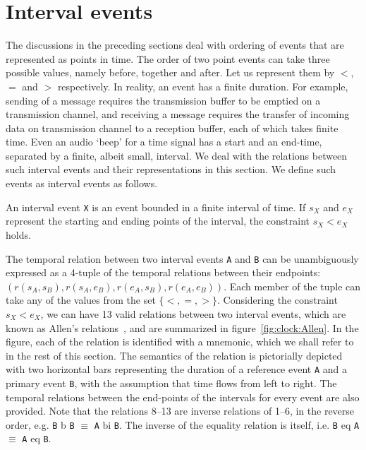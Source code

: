 \section{Interval events}

The discussions in the preceding sections deal with ordering of events that are represented as points in time. 
The order of two point events can take three possible values, namely before, together and after. Let us represent them by 
$<$, $=$ and $>$ respectively.
%
In reality, an event has a finite duration. For example, sending of a message requires the transmission buffer to be emptied 
on a transmission channel, and receiving a message requires the transfer of incoming data on transmission channel to a 
reception buffer, each of which takes finite time. Even an audio `beep' for a time signal has a start and an end-time, 
separated by a finite, albeit small, interval. We deal with the relations between such interval events and their representations 
in this section.  We define such events as interval events as follows.

\begin{definition}
	An interval event \texttt{X} is an event bounded in a finite interval of time. If $s_X$ and $e_X$ represent
	the starting and ending points of the interval, the constraint $s_X < e_X$ holds.
\end{definition}

The temporal relation between two interval events \texttt{A} and \texttt{B} can be unambiguously expressed as a 4-tuple of  
the temporal relations between their endpoints: $( r(s_A, s_B), r(s_A, e_B), r(e_A, s_B), r(e_A, e_B) )$. Each member of the 
tuple can take any of the values from the set $\{<,=,>\}$. Considering the constraint $s_X < e_X$, we can have 13 valid relations
between two interval events, which are known as Allen's relations~\cite{Allen:1983}, and are summarized in 
figure~\ref{fig:clock:Allen}. 
%
In the figure, each of the relation is identified with a mnemonic, which we shall refer to in the rest of this section. The semantics 
of the relation is pictorially depicted with two horizontal bars representing the duration of a reference event \texttt{A} and 
a primary event \texttt{B}, with the assumption that time flows from left to right. The temporal relations between the end-points 
of the intervals for every event are also provided. 
Note that the relations 8--13 are inverse relations of 1--6, in the reverse order, e.g. 
\texttt{B} b \texttt{B} $\equiv$ \texttt{A} bi \texttt{B}. The inverse of the equality relation is itself, i.e. 
\texttt{B} eq \texttt{A} $\equiv$ \texttt{A} eq \texttt{B}.

